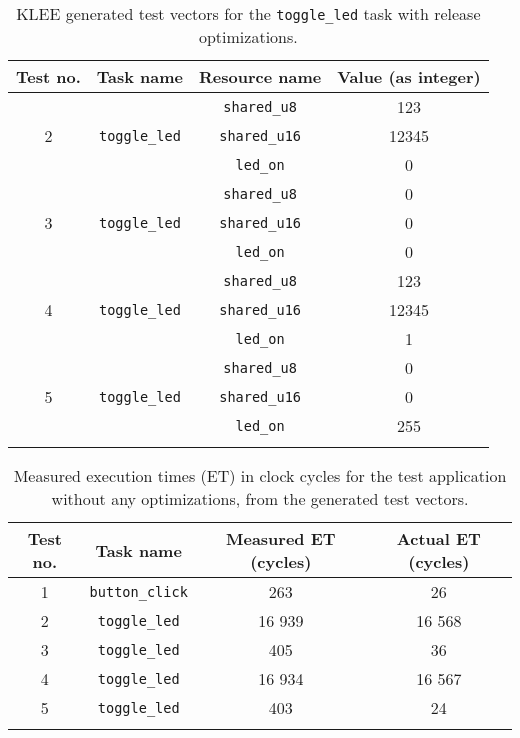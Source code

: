 \begin{longtable}{|c|c|c|c|}
\hline
Test no. & Task name & Resource name & Value (as integer) \\ \hline
\multirow{3}{*}{2} & \multirow{3}{*}{\texttt{toggle\_led}} & \texttt{shared\_u8}  & 123 \\ \cline{3-4}
                   &                                       & \texttt{shared\_u16} & 12345 \\ \cline{3-4}
                   &                                       & \texttt{led\_on}     & 0 \\ \hline
\multirow{3}{*}{3} & \multirow{3}{*}{\texttt{toggle\_led}} & \texttt{shared\_u8}  & 0 \\ \cline{3-4}
                   &                                       & \texttt{shared\_u16} & 0 \\ \cline{3-4}
                   &                                       & \texttt{led\_on}     & 0 \\ \hline
\multirow{3}{*}{4} & \multirow{3}{*}{\texttt{toggle\_led}} & \texttt{shared\_u8}  & 123 \\ \cline{3-4}
                   &                                       & \texttt{shared\_u16} & 12345 \\ \cline{3-4}
                   &                                       & \texttt{led\_on}     & 1 \\ \hline
\multirow{3}{*}{5} & \multirow{3}{*}{\texttt{toggle\_led}} & \texttt{shared\_u8}  & 0 \\ \cline{3-4}
                   &                                       & \texttt{shared\_u16} & 0 \\ \cline{3-4}
                   &                                       & \texttt{led\_on}     & 255 \\ \hline
\caption{KLEE generated test vectors for the \texttt{toggle\_led} task with release optimizations.}
\label{tab:evalreleaseteststoggle}
\end{longtable}

\begin{longtable}{|c | c | c | c|}
    \hline
    Test no. & Task name & Measured ET (cycles) & Actual ET (cycles) \\ [0.5ex]
    \hline
    1 & \texttt{button\_click} & 263 & 26 \\
    \hline
    2 & \texttt{toggle\_led} & 16 939 & 16 568 \\
    \hline
    3 & \texttt{toggle\_led} & 405 & 36 \\
    \hline
    4 & \texttt{toggle\_led} & 16 934 & 16 567 \\
    \hline
    5 & \texttt{toggle\_led} & 403 & 24 \\
    \hline
\caption{Measured execution times (ET) in clock cycles for the test application without any optimizations, from the generated test vectors.}
\label{tab:evalreleasemeasure}
\end{longtable}


